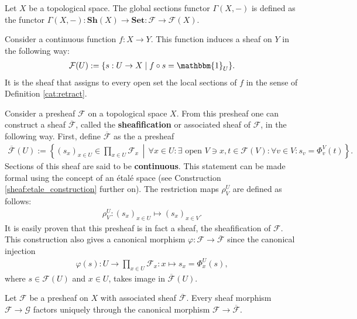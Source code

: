    \begin{example}\label{sheaf:global_sections_functor}
        Let $X$ be a topological space. The global sections functor $\Gamma(X,-)$ is defined as the functor $\Gamma(X,-):\mathbf{Sh}(X)\rightarrow\mathbf{Set}:\mathcal{F}\rightarrow\mathcal{F}(X)$.
    \end{example}
    \begin{example}
        Consider a continuous function $f:X\rightarrow Y$. This function induces a sheaf on $Y$ in the following way:
        \begin{gather}
            \mathcal{F}(U) := \{s:U\rightarrow X\mid f\circ s=\mathbbm{1}_U\}.
        \end{gather}
        It is the sheaf that assigns to every open set the local sections of $f$ in the sense of Definition \ref{cat:retract}.
    \end{example}

    \begin{construct}
        Consider a presheaf $\mathcal{F}$ on a topological space $X$. From this presheaf one can construct a sheaf $\overline{\mathcal{F}}$, called the \textbf{sheafification} or associated sheaf of $\mathcal{F}$, in the following way. First, define $\overline{\mathcal{F}}$ as the a presheaf
        \begin{gather}
            \overline{\mathcal{F}}(U) := \left\{(s_x)_{x\in U}\in\prod_{x\in U}\mathcal{F}_x\,\middle\vert\,\forall x\in U:\exists\text{ open }V\ni x,t\in\mathcal{F}(V):\forall v\in V:s_v = \Phi^V_v(t)\right\}.
        \end{gather}
        Sections of this sheaf are said to be \textbf{continuous}. This statement can be made formal using the concept of an \'etal\'e space (see Construction \ref{sheaf:etale_construction} further on). The restriction maps $\rho^U_V$ are defined as follows:
        \begin{gather}
            \rho^U_V:(s_x)_{x\in U}\mapsto(s_x)_{x\in V}.
        \end{gather}
        It is easily proven that this presheaf is in fact a sheaf, the sheafification of $\mathcal{F}$. This construction also gives a canonical morphism $\varphi:\mathcal{F}\rightarrow\overline{\mathcal{F}}$ since the canonical injection
        \begin{gather}
            \varphi(s):U\rightarrow\prod_{x\in U}\mathcal{F}_x:x \mapsto s_x = \Phi^U_x(s),
        \end{gather}
        where $s\in\mathcal{F}(U)$ and $x\in U$, takes image in $\overline{\mathcal{F}}(U)$.
    \end{construct}
    \begin{uproperty}
        Let $\mathcal{F}$ be a presheaf on $X$ with associated sheaf $\overline{\mathcal{F}}$. Every sheaf morphism $\mathcal{F}\rightarrow \mathcal{G}$ factors uniquely through the canonical morphism $\mathcal{F}\rightarrow\overline{\mathcal{F}}$.
    \end{uproperty}

